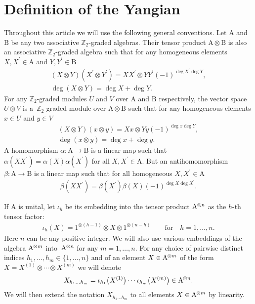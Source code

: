 \documentclass[10pt,a4paper]{amsart}
\numberwithin{equation}{section}
\def\al{\alpha}
\def\be{\beta}
\def\ns{{\hskip-.5pt}}
\def\ot{\otimes}
\def\ZZ{\mathbb{Z}}
\begin{document}
\section{Definition of the Yangian}\label{sec:1}

Throughout this article we will use the following general conventions.
Let $\mathrm{A}$ and $\mathrm{B}$ be any two associative
$\ZZ_{2}$-graded algebras. Their tensor product
$\mathrm{A}\ot\mathrm{B}$ is also
an associative $\ZZ_2$-graded algebra such that for any homogeneous
elements
$X,X^\prime\in\mathrm{A}$ and $Y,Y^\prime\in\mathrm{B}$
\begin{gather}\label{conv1}
(X\ot Y) (X^\prime\ot Y^\prime)=X X^\prime\ot Y Y^\prime (-1)^{\deg X^\prime\deg Y},\\
\label{conv2}
\deg (X\ot Y)=\deg X+\deg Y .
\end{gather}
For any $\ZZ_2$-graded modules
$U$ and $V$ over $\mathrm{A}$ and $\mathrm{B}$ respectively,
the vector space $U\ot V$ is a~$\ZZ_2$-graded module over
$\mathrm{A}\ot\mathrm{B}$ such that for any homogeneous elements
$x\in U$ and $y\in V$
\begin{gather}\label{XY}
(X\ot Y) ( x\ot y ) =X x\ot Y y (-1)^{\deg x \deg Y},\\
\label{xy}
\deg ( x\ot y )=\deg x+\deg y .
\end{gather}
A homomorphism $\al\colon \mathrm{A}\to\mathrm{B}$ is a linear map
such that $\al (X X^\prime)=\al (X) \al (X^\prime)$ for all
$X,X^\prime\in\mathrm{A} $. But an antihomomorphism
$\be\colon \mathrm{A}\to\mathrm{B}$ is a linear map
such that for all homogeneous $X,X^\prime\in\mathrm{A}$
\begin{gather}\label{bb}
\be (X X^\prime )=\be (X^\prime) \be (X) (-1)^{\deg X\deg X^\prime}.
\end{gather}

If $\mathrm{A}$ is unital,
let $\iota_{h}$ be
its embedding into the tensor product $\mathrm{A}^{\ns\ot n}$
as the $h $-th tensor factor:
\begin{gather*}
\iota_{h}(X)=1^{\ot (h-1)}\ot X\ot1^{\ot (n-h)}\qquad\text{for}\quad h=1,\dots, n .
\end{gather*}
Here $n$ can be any positive integer.
We will also use various embeddings of the algebra
$\mathrm{A}^{\ns\ot m}$ into~$\mathrm{A}^{\ns\ot n}$
for any $m=1,\dots, n$.
For any choice of pairwise distinct indices $h_1,\dots, h_m\in\{1,\dots, n \}$
and of an element $X\in\mathrm{A}^{\ns\ot m}$ of the form
$X=X^{(1)}\ot\cdots\ot X^{(m)}$ we will denote
\begin{gather*}
X_{h_1\dots h_m}=\iota_{h_1}\big(X^{(1)}\big) \cdots \iota_{h_m}\big(X^{(m)}\big) \in\mathrm{A}^{\ns\ot n}.
\end{gather*}
We will then extend the notation $X_{h_1\dots h_m}$ to all elements
$X\in\mathrm{A}^{\ns\ot m}$ by linearity.
\end{document}
